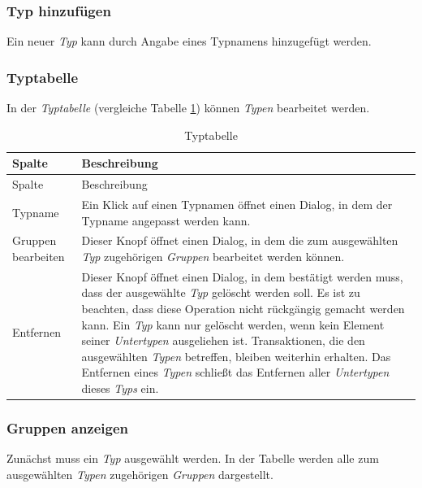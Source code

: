 \documentclass[
]{article}
\begin{document}
\hypertarget{typ-hinzufuxfcgen}{%
\subsubsection{Typ hinzufügen}\label{typ-hinzufuxfcgen}}

Ein neuer \emph{Typ} kann durch Angabe eines Typnamens hinzugefügt werden.

\hypertarget{typtabelle}{%
\subsubsection{Typtabelle}\label{typtabelle}}

In der \emph{Typtabelle} (vergleiche Tabelle \ref{tab:type-table}) können \emph{Typen} bearbeitet werden.

\begin{longtable}[]{@{}
  >{\raggedright\arraybackslash}p{}
  >{\raggedright\arraybackslash}p{}@{}}
\caption{\label{tab:type-table} Typtabelle}\tabularnewline
\toprule
Spalte & Beschreibung \\
\midrule
\endfirsthead
\toprule
Spalte & Beschreibung \\
\midrule
\endhead
Typname & Ein Klick auf einen Typnamen öffnet einen Dialog, in dem der Typname angepasst werden kann. \\
Gruppen bearbeiten & Dieser Knopf öffnet einen Dialog, in dem die zum ausgewählten \emph{Typ} zugehörigen \emph{Gruppen} bearbeitet werden können. \\
Entfernen & Dieser Knopf öffnet einen Dialog, in dem bestätigt werden muss, dass der ausgewählte \emph{Typ} gelöscht werden soll. Es ist zu beachten, dass diese Operation nicht rückgängig gemacht werden kann. Ein \emph{Typ} kann nur gelöscht werden, wenn kein Element seiner \emph{Untertypen} ausgeliehen ist. Transaktionen, die den ausgewählten \emph{Typen} betreffen, bleiben weiterhin erhalten. Das Entfernen eines \emph{Typen} schließt das Entfernen aller \emph{Untertypen} dieses \emph{Typs} ein. \\
\bottomrule
\end{longtable}

\hypertarget{gruppen-anzeigen}{%
\subsubsection{Gruppen anzeigen}\label{gruppen-anzeigen}}

Zunächst muss ein \emph{Typ} ausgewählt werden. In der Tabelle werden alle zum ausgewählten \emph{Typen} zugehörigen \emph{Gruppen} dargestellt.
\end{document}
